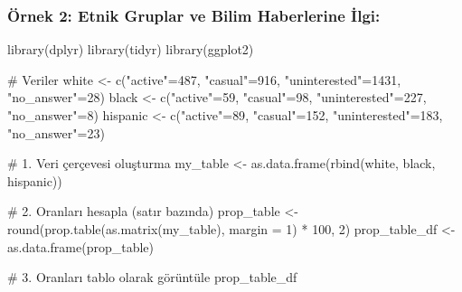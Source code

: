 \documentclass[
  letterpaper,
  DIV=11,
  numbers=noendperiod]{scrartcl}
\newenvironment{Shaded}{\begin{snugshade}}{\end{snugshade}}
\newcommand{\AttributeTok}[1]{\textcolor[rgb]{0.40,0.45,0.13}{#1}}
\newcommand{\CommentTok}[1]{\textcolor[rgb]{0.37,0.37,0.37}{#1}}
\newcommand{\DecValTok}[1]{\textcolor[rgb]{0.68,0.00,0.00}{#1}}
\newcommand{\FunctionTok}[1]{\textcolor[rgb]{0.28,0.35,0.67}{#1}}
\newcommand{\NormalTok}[1]{\textcolor[rgb]{0.00,0.23,0.31}{#1}}
\newcommand{\OtherTok}[1]{\textcolor[rgb]{0.00,0.23,0.31}{#1}}
\newcommand{\SpecialCharTok}[1]{\textcolor[rgb]{0.37,0.37,0.37}{#1}}
\newcommand{\StringTok}[1]{\textcolor[rgb]{0.13,0.47,0.30}{#1}}
\begin{document}
\hypertarget{uxf6rnek-2-etnik-gruplar-ve-bilim-haberlerine-ilgi}{%
\subsubsection{\texorpdfstring{Örnek 2: \textbf{Etnik Gruplar ve Bilim
Haberlerine
İlgi}:}{Örnek 2: Etnik Gruplar ve Bilim Haberlerine İlgi:}}\label{uxf6rnek-2-etnik-gruplar-ve-bilim-haberlerine-ilgi}}

\begin{Shaded}
\begin{Highlighting}[]
\FunctionTok{library}\NormalTok{(dplyr)}
\FunctionTok{library}\NormalTok{(tidyr)}
\FunctionTok{library}\NormalTok{(ggplot2)}

\CommentTok{\# Veriler}
\NormalTok{white }\OtherTok{\textless{}{-}} \FunctionTok{c}\NormalTok{(}\StringTok{"active"}\OtherTok{=}\DecValTok{487}\NormalTok{, }\StringTok{"casual"}\OtherTok{=}\DecValTok{916}\NormalTok{, }\StringTok{"uninterested"}\OtherTok{=}\DecValTok{1431}\NormalTok{, }\StringTok{"no\_answer"}\OtherTok{=}\DecValTok{28}\NormalTok{)}
\NormalTok{black }\OtherTok{\textless{}{-}} \FunctionTok{c}\NormalTok{(}\StringTok{"active"}\OtherTok{=}\DecValTok{59}\NormalTok{, }\StringTok{"casual"}\OtherTok{=}\DecValTok{98}\NormalTok{, }\StringTok{"uninterested"}\OtherTok{=}\DecValTok{227}\NormalTok{, }\StringTok{"no\_answer"}\OtherTok{=}\DecValTok{8}\NormalTok{)}
\NormalTok{hispanic }\OtherTok{\textless{}{-}} \FunctionTok{c}\NormalTok{(}\StringTok{"active"}\OtherTok{=}\DecValTok{89}\NormalTok{, }\StringTok{"casual"}\OtherTok{=}\DecValTok{152}\NormalTok{, }\StringTok{"uninterested"}\OtherTok{=}\DecValTok{183}\NormalTok{, }\StringTok{"no\_answer"}\OtherTok{=}\DecValTok{23}\NormalTok{)}

\CommentTok{\# 1. Veri çerçevesi oluşturma}
\NormalTok{my\_table }\OtherTok{\textless{}{-}} \FunctionTok{as.data.frame}\NormalTok{(}\FunctionTok{rbind}\NormalTok{(white, black, hispanic))}

\CommentTok{\# 2. Oranları hesapla (satır bazında)}
\NormalTok{prop\_table }\OtherTok{\textless{}{-}} \FunctionTok{round}\NormalTok{(}\FunctionTok{prop.table}\NormalTok{(}\FunctionTok{as.matrix}\NormalTok{(my\_table), }\AttributeTok{margin =} \DecValTok{1}\NormalTok{) }\SpecialCharTok{*} \DecValTok{100}\NormalTok{, }\DecValTok{2}\NormalTok{)}
\NormalTok{prop\_table\_df }\OtherTok{\textless{}{-}} \FunctionTok{as.data.frame}\NormalTok{(prop\_table)}

\CommentTok{\# 3. Oranları tablo olarak görüntüle}
\NormalTok{prop\_table\_df}
\end{Highlighting}
\end{Shaded}
\end{document}
